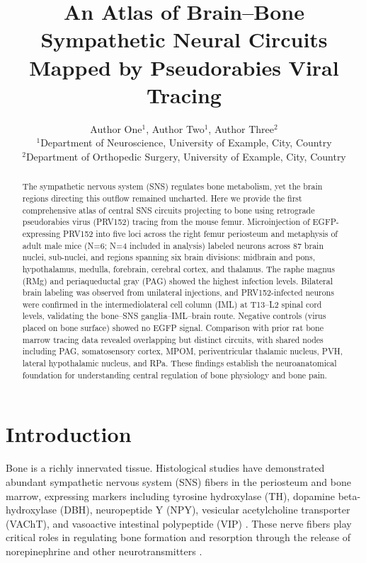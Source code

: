 \documentclass[12pt]{article}
\title{An Atlas of Brain--Bone Sympathetic Neural Circuits Mapped by Pseudorabies Viral Tracing}
\author{Author One$^{1}$, Author Two$^{1}$, Author Three$^{2}$ \\
\small $^{1}$Department of Neuroscience, University of Example, City, Country \\
\small $^{2}$Department of Orthopedic Surgery, University of Example, City, Country}
\date{}
\begin{document}
\maketitle

\begin{abstract}
The sympathetic nervous system (SNS) regulates bone metabolism, yet the brain regions directing this outflow remained uncharted. Here we provide the first comprehensive atlas of central SNS circuits projecting to bone using retrograde pseudorabies virus (PRV152) tracing from the mouse femur. Microinjection of EGFP-expressing PRV152 into five loci across the right femur periosteum and metaphysis of adult male mice (N=6; N=4 included in analysis) labeled neurons across 87 brain nuclei, sub-nuclei, and regions spanning six brain divisions: midbrain and pons, hypothalamus, medulla, forebrain, cerebral cortex, and thalamus. The raphe magnus (RMg) and periaqueductal gray (PAG) showed the highest infection levels. Bilateral brain labeling was observed from unilateral injections, and PRV152-infected neurons were confirmed in the intermediolateral cell column (IML) at T13--L2 spinal cord levels, validating the bone--SNS ganglia--IML--brain route. Negative controls (virus placed on bone surface) showed no EGFP signal. Comparison with prior rat bone marrow tracing data revealed overlapping but distinct circuits, with shared nodes including PAG, somatosensory cortex, MPOM, periventricular thalamic nucleus, PVH, lateral hypothalamic nucleus, and RPa. These findings establish the neuroanatomical foundation for understanding central regulation of bone physiology and bone pain.
\end{abstract}

\section{Introduction}

Bone is a richly innervated tissue. Histological studies have demonstrated abundant sympathetic nervous system (SNS) fibers in the periosteum and bone marrow, expressing markers including tyrosine hydroxylase (TH), dopamine beta-hydroxylase (DBH), neuropeptide Y (NPY), vesicular acetylcholine transporter (VAChT), and vasoactive intestinal polypeptide (VIP) \citep{bjurholm1991, mach2002, elefteriou2005}. These nerve fibers play critical roles in regulating bone formation and resorption through the release of norepinephrine and other neurotransmitters \citep{takeda2002, elefteriou2005}.
\end{document}
